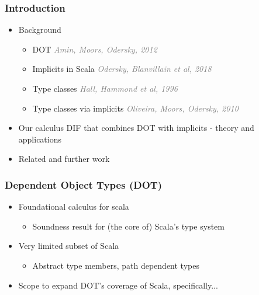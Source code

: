 \begin{frame}
    \titlepage
\end{frame}

\begin{frame}
    \frametitle{Introduction}
    \begin{itemize}
        \pause
        \item Background
        \begin{itemize}
            \item DOT \hfill \textcolor{grey}{\emph{Amin, Moors, Odersky, 2012}}
            \item Implicits in Scala \hfill \textcolor{grey}{\emph{Odersky,
                Blanvillain et al, 2018}}
            \item Type classes \hfill \textcolor{grey}{\emph{Hall, Hammond et
                al, 1996}}
            \item Type classes via implicits \hfill
                \textcolor{grey}{\emph{Oliveira, Moors, Odersky, 2010}}
        \end{itemize}
        \pause
        \item Our calculus DIF that combines DOT with implicits - theory and
            applications
        \pause
        \item Related and further work
    \end{itemize}
\end{frame}

\begin{frame}
\end{frame}

\begin{frame}
    \frametitle{Dependent Object Types (DOT)}
    \begin{itemize}
        \pause
        \item Foundational calculus for scala
        \begin{itemize}
            \pause
            \item Soundness result for (the core of) Scala's type system
        \end{itemize}
        \pause
        \item Very limited subset of Scala
        \begin{itemize}
            \pause
            \item Abstract type members, path dependent types
        \end{itemize}
        \pause
        \item Scope to expand DOT's coverage of Scala\pause, specifically...
    \end{itemize}
\end{frame}

